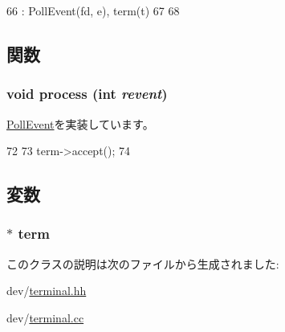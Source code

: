 \begin{DoxyCode}
66     : PollEvent(fd, e), term(t)
67 {
68 }
\end{DoxyCode}


\subsection{関数}
\hypertarget{classTerminal_1_1ListenEvent_aedacbaeee0c89ceca526874c34f6b20b}{
\subsubsection[{process}]{\setlength{\rightskip}{0pt plus 5cm}void process (int {\em revent})}}
\label{classTerminal_1_1ListenEvent_aedacbaeee0c89ceca526874c34f6b20b}


\hyperlink{classPollEvent_a8b870dc0eeb339499d64aa56fc0e2aa5}{PollEvent}を実装しています。


\begin{DoxyCode}
72 {
73     term->accept();
74 }
\end{DoxyCode}


\subsection{変数}
\hypertarget{classTerminal_1_1ListenEvent_a61b35a33209eb5f0de1f6f97f543ef92}{
\subsubsection[{term}]{$\ast$ {\bf term}}}
\label{classTerminal_1_1ListenEvent_a61b35a33209eb5f0de1f6f97f543ef92}


このクラスの説明は次のファイルから生成されました:\begin{DoxyCompactItemize}
\item 
dev/\hyperlink{terminal_8hh}{terminal.hh}\item 
dev/\hyperlink{terminal_8cc}{terminal.cc}\end{DoxyCompactItemize}
